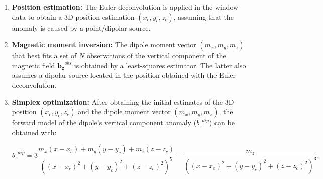 \begin{enumerate}
    \item \textbf{Position estimation:} The Euler deconvolution is applied in the window data to obtain a 3D position estimation $(x_c, y_c, z_c)$, assuming that the anomaly is caused by a point/dipolar source.
    
    \item \textbf{Magnetic moment inversion:} The dipole moment vector $(m_x, m_y, m_z)$ that best fits a set of $N$ observations of the vertical component of the magnetic field $\mathbf{b_z}^{obs}$ is obtained by a least-squares estimator. The latter also assumes a dipolar source located in the position obtained with the Euler deconvolution.
    
    \item \textbf{Simplex optimization:} After obtaining the initial estimates of the 3D position $(x_c, y_c, z_c)$ and the dipole moment vector $(m_x, m_y, m_z)$, the forward model of the dipole's vertical component anomaly (${b_z}^{dip}$) can be obtained with:
    
    \begin{equation}
        \label{bz_dipole_equation}
        {b_z}^{dip} = 3 \frac{m_x (x-x_c) + m_y (y-y_c) + m_z (z-z_c)}{((x-x_c)^2 + (y-y_c)^2 + (z-z_c)^2)^5} - \frac{m_z}{((x-x_c)^2 + (y-y_c)^2 + (z-z_c)^2)^3} .
    \end{equation}
        
\end{enumerate}
